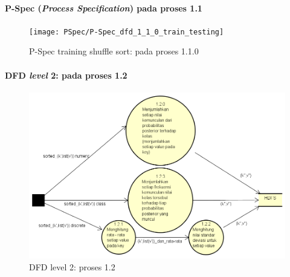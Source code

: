 \paragraph{P-Spec (\textit{Process Specification}) pada proses 1.1}
\begin{figure}[H]
	\centering
	\texttt{[image: PSpec/P-Spec\_dfd\_1\_1\_0\_train\_testing]}
	\caption[P-Spec training reduce: pada proses 1.1.0]{P-Spec training shuffle sort: pada proses 1.1.0}
	\label{fig:P-Spec training shuffle sort: pada proses 1.1.0}
\end{figure}


\paragraph{DFD \textit{level} 2: pada proses 1.2}
\begin{figure}[H]
	\centering
	\includegraphics[scale=0.6]{Diagram/DFD_1_3_Training_Red}
	\caption[DFD level 2: proses 1.2]{DFD level 2: proses 1.2}
	\label{fig:DFD level 2: proses 1.2}
\end{figure}

